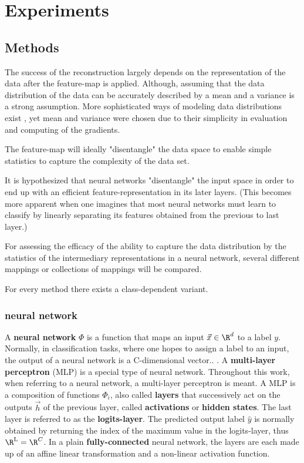 
\chapter{Experiments}
\label{chap:Experiments} 

\section{Methods}

The success of the reconstruction largely depends on the representation of the data
after the feature-map is applied.
Although, assuming that the data distribution of the data can be accurately described
by a mean and a variance is a strong assumption.
More sophisticated ways of modeling data distributions exist
, yet mean and variance were chosen due to their simplicity in evaluation and computing of the gradients.

The feature-map will ideally "disentangle" the data space to enable 
simple statistics to capture the complexity of the data set.

It is hypothesized that neural networks "disentangle" the input space in order to end up with an efficient feature-representation in its later layers.
(This becomes more apparent when one imagines that most neural networks must learn to classify by linearly separating its features obtained from the previous to last layer.)


For assessing the efficacy of the ability to capture the data distribution by
the statistics of the intermediary representations in a neural network,
several different mappings or collections of mappings will be compared. 

For every method there exists a class-dependent variant.
\subsection{neural network}

A \textbf{neural network} $\Phi$ is a function that maps an input $\vec x \in \R^d$ to a label $y$.
Normally, in classification tasks, where one hopes to assign a label to an input, the output of a neural network is a C-dimensional vector..
. 
A \textbf{multi-layer perceptron} (MLP) is a special type of neural network. Throughout this work, when referring to a neural network, a multi-layer perceptron is meant. A MLP is a composition of functions $\Phi_i$, also called \textbf{layers} that successively act on the outputs $\vec h$ of the previous layer, called \textbf{activations} or \textbf{hidden states}. 
The last layer is referred to as the \textbf{logits-layer}. 
The predicted output label $\hat y$ is normally obtained by returning the index of the maximum value in the logits-layer, thus $\R^{\textnormal L} = \R^C$.
In a plain \textbf{fully-connected} neural network, the layers are each made up of an affine linear transformation and a non-linear activation function.

